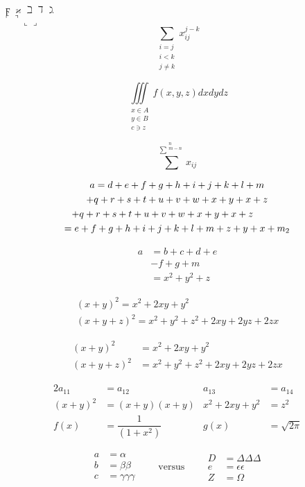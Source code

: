 \documentclass[11pt]{article}
\begin{document}
$\digamma \varkappa \beth \daleth \gimel$ \\

$\ulcorner \urcorner \llcorner \lrcorner$ \\

$$\sum_{\substack{i=j\\ i<k \\ j\neq k}}x_{ij}^{j-k}$$

$$\iiint \limits_{\substack{x\in A \\ y \in B \\ c \ni z}} f(x, y, z) dxdydz$$

$$\sum^{\sum^{\substack{n \\ m-n }}} x_{ij}$$

\begin{multline} \label{eq:multline}
a = d+e+f+g+h+i+j+k+l+m\\
+q+r+s+t+u+v+w+x+y+x+z\\
\shoveleft{+q+r+s+t+u+v+w+x+y+x+z}\\
=e+f+g+h+i+j+k+l+m+z+y+x+m_2\\
\end{multline}

\begin{equation}
\begin{split}
a &= b + c + d + e \\
  &- f + g + m \\
  &= x^2 + y^2+z
\end{split}
\end{equation}

\begin{gather}
(x+y)^2=x^2+2xy+y^2\\
(x+y+z)^2=x^2+y^2+z^2+2xy+2yz+2zx
\end{gather}

\begin{align}
(x+y)^2 &= x^2+2xy+y^2 \\
(x+y+z)^2 &= x^2 + y^2 + z^2 + 2xy + 2yz + 2zx
\end{align}

\begin{alignat}{2}
a_{11} &= a_{12} & a_{13} &= a_{14} \\
(x+y)^2 &= (x+y)(x+y) & x^2+2xy+y^2 &= z^2 \\
f(x) &= \dfrac{1}{(1+x^2)} & g(x) &= \sqrt{2\pi}
\end{alignat}

\begin{equation} 
\begin{aligned}
a &= \alpha \\
b &= \beta \beta \\
c &= \gamma\gamma\gamma
\end{aligned} \qquad \text{versus} \qquad
\begin{aligned}
D &= \Delta\Delta\Delta \\
e &= \epsilon\epsilon \\
Z &= \Omega
\end{aligned}
\end{equation}
\end{document}
